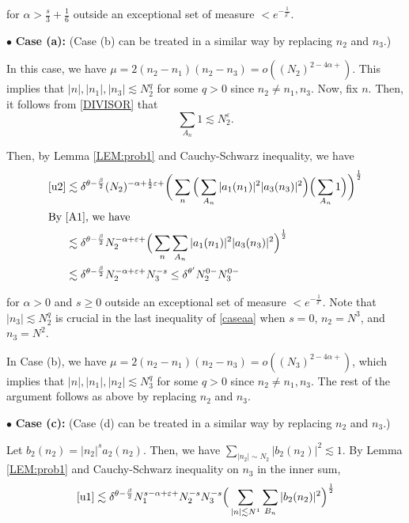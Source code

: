 \documentclass[11pt]{amsart}
\numberwithin{equation}{section} \numberwithin{theorem}{section}
\begin{document}
{
\noindent}  for ${\alpha} > \frac{s}{3} + \frac{1}{6}$ outside an exceptional set of measure $< e^{-\frac{1}{{\delta}^c}}$.

\medskip

{
\noindent} $\bullet$ {\bf Case (a):} (Case (b) can be treated in a similar way by replacing $n_2$ and $n_3$.)

In this case, we have $\mu = 2 (n_2 - n_1) (n_2 - n_3) = o( (N_2)^{2-4{\alpha}+})$. 
This implies that $|n|, |n_1|, |n_3| \lesssim N_2^q$ for some $q > 0$ since $n_2 \ne n_1, n_3$. 
Now, fix $n$.
Then, it follows from \eqref{DIVISOR}
that 
\begin{equation}\label{A1}
\sum_{A_n} 1 \lesssim N_2^{\varepsilon}.
\end{equation}

{
\noindent}
Then, by Lemma \ref{LEM:prob1} and Cauchy-Schwarz inequality, we have 
\begin{align}
	\label{caseaa} \eqref{u2} & 
	\lesssim {\delta}^{\theta-\frac{\beta}{2}} (N_2)^{-{\alpha} + \frac{1}{2}{\varepsilon} +} 
	\bigg( \sum_n  \Big(\sum_{A_n}|a_1(n_1)|^2|a_3(n_3)|^2\Big)
	 \Big(\sum_{A_n}1\Big)\bigg)^\frac{1}{2} \notag \\
	\intertext{By  \eqref{A1}, we have } 
	& \lesssim {\delta}^{\theta-\frac{\beta}{2}} N_2^{-{\alpha}+{\varepsilon}+} 
	\Big( \sum_n  \sum_{A_n}|a_1(n_1)|^2|a_3(n_3)|^2
	 \Big)^\frac{1}{2} \notag \\
		& \lesssim {\delta}^{\theta-\frac{\beta}{2}} N_2^{-{\alpha}+{\varepsilon}+} N_3^{-s}\leq {\delta}^{\theta'} N_2^{0-} N_3^{0-} 
\end{align}

{
\noindent} for ${\alpha} > 0$ and $s\geq 0 $ outside an exceptional set of measure $< e^{-\frac{1}{{\delta}^c}}$.
Note that $|n_3| \lesssim N_2^q$ is crucial in the last inequality of \eqref{caseaa} when $s = 0$, $n_2 = N^3$, and $n_3 = N^2$. 

In Case (b), we have $\mu = 2 (n_2 - n_1) (n_2 - n_3) = o( (N_3)^{2-4{\alpha}+})$, which implies that $|n|, |n_1|, |n_2| \lesssim N_3^q$ for some $q > 0$ since $n_2 \ne n_1, n_3$. The rest of the argument follows as above by replacing $n_2$ and $n_3$.

\medskip

{
\noindent} $\bullet$ {\bf Case (c):} (Case (d) can be treated in a similar way by replacing $n_2$ and $n_3$.)

Let $b_2(n_2) = |n_2|^s a_2(n_2)$. Then, we have $\sum_{|n_2|\sim N_2} |b_2(n_2)|^2 \lesssim 1$. By Lemma \ref{LEM:prob1} and Cauchy-Schwarz inequality on $n_3$ in the inner sum, 
\begin{align*}
	\eqref{u1} \lesssim {\delta}^{\theta-\frac{\beta}{2}} N_1^{s -{\alpha} +{\varepsilon}+} N_2^{-s} N_3^{-s} \Big( \sum_{|n| \lesssim N^1} \sum_{B_n} |b_2(n_2)|^2 \Big)^\frac{1}{2} 
\end{align*}
\end{document}
